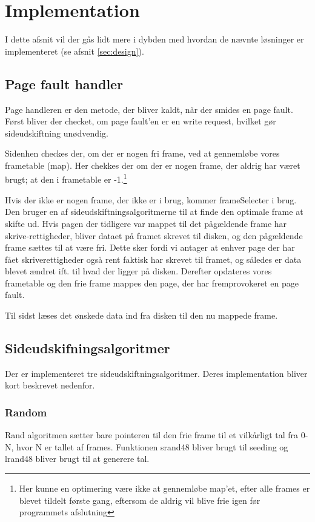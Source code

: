 \section{Implementation}
I dette afsnit vil der gås lidt mere i dybden med hvordan de nævnte løsninger er implementeret (se afsnit \ref{sec:design}).

\subsection{Page fault handler}
Page handleren er den metode, der bliver kaldt, når der smides en page fault. Først bliver der checket, om page fault'en er en write request, hvilket gør sideudskiftning unødvendig.

Sidenhen checkes der, om der er nogen fri frame, ved at gennemløbe vores frametable (map). Her chekkes der om der er nogen frame, der aldrig har været brugt; at den i frametable er -1.\footnote{Her kunne en optimering være ikke at gennemløbe map'et, efter alle frames er blevet tildelt første gang, eftersom de aldrig vil blive frie igen før programmets afslutning}

Hvis der ikke er nogen frame, der ikke er i brug, kommer frameSelecter i brug. Den bruger en af sideudskiftningsalgoritmerne til at finde den optimale frame at skifte ud. Hvis pagen der tidligere var mappet til det pågældende frame har skrive-rettigheder, bliver dataet på framet skrevet til disken, og den pågældende frame sættes til at være fri. Dette sker fordi vi antager at enhver page der har fået skriverettigheder også rent faktisk har skrevet til framet, og således er data blevet ændret ift. til hvad der ligger på disken. Derefter opdateres vores frametable og den frie frame mappes den page, der har fremprovokeret en page fault.

Til sidst læses det ønskede data ind fra disken til den nu mappede frame.

\subsection{Sideudskifningsalgoritmer}
Der er implementeret tre sideudskiftningsalgoritmer. Deres implementation bliver kort beskrevet nedenfor.

\subsubsection{Random}
Rand algoritmen sætter bare pointeren til den frie frame til et vilkårligt tal fra 0-N, hvor N er tallet af frames. Funktionen srand48 bliver brugt til seeding og lrand48 bliver brugt til at generere tal.

